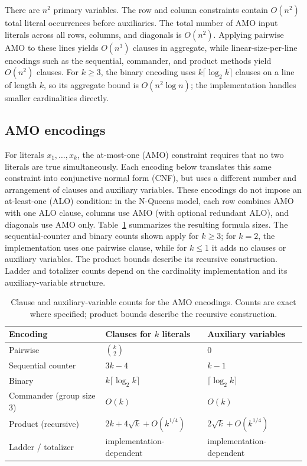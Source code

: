 \documentclass[a4paper,fleqn]{cas-sc}
\begin{document}
There are $n^2$ primary variables. The row and column constraints contain $O(n^2)$ total literal occurrences before auxiliaries. The total number of AMO input literals across all rows, columns, and diagonals is $O(n^2)$. Applying pairwise AMO to these lines yields $O(n^3)$ clauses in aggregate, while linear-size-per-line encodings such as the sequential, commander, and product methods yield $O(n^2)$ clauses. For $k\geq3$, the binary encoding uses $k\lceil\log_2 k\rceil$ clauses on a line of length $k$, so its aggregate bound is $O(n^2\log n)$; the implementation handles smaller cardinalities directly.

\subsection{AMO encodings}
For literals $x_1,\ldots,x_k$, the at-most-one (AMO) constraint requires that no two literals are true simultaneously. Each encoding below translates this same constraint into conjunctive normal form (CNF), but uses a different number and arrangement of clauses and auxiliary variables. These encodings do not impose an at-least-one (ALO) condition: in the N-Queens model, each row combines AMO with one ALO clause, columns use AMO (with optional redundant ALO), and diagonals use AMO only. Table~\ref{tab:amo} summarizes the resulting formula sizes. The sequential-counter and binary counts shown apply for $k\geq3$; for $k=2$, the implementation uses one pairwise clause, while for $k\leq1$ it adds no clauses or auxiliary variables. The product bounds describe its recursive construction. Ladder and totalizer counts depend on the cardinality implementation and its auxiliary-variable structure.

\begin{table}[t]
\caption{Clause and auxiliary-variable counts for the AMO encodings. Counts are exact where specified; product bounds describe the recursive construction.}
\label{tab:amo}
\centering
\small
\begin{tabular}{lll}
\toprule
Encoding & Clauses for $k$ literals & Auxiliary variables \\
\midrule
Pairwise & $\binom{k}{2}$ & $0$ \\
Sequential counter & $3k-4$ & $k-1$ \\
Binary & $k\lceil\log_2 k\rceil$ & $\lceil\log_2 k\rceil$ \\
Commander (group size 3) & $O(k)$ & $O(k)$ \\
Product (recursive) & $2k+4\sqrt{k}+O(k^{1/4})$ & $2\sqrt{k}+O(k^{1/4})$ \\
Ladder / totalizer & implementation-dependent & implementation-dependent \\
\bottomrule
\end{tabular}
\end{table}
\end{document}
